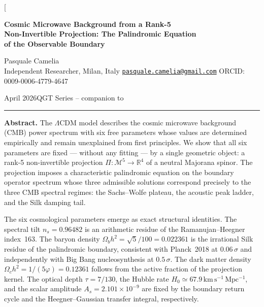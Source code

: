 \documentclass[twocolumn,10pt]{article}
\begin{document}
\emergencystretch=12pt
\frenchspacing\raggedbottom

\twocolumn[{%
\begin{center}
{\LARGE\bfseries
Cosmic Microwave Background from a Rank-5\\[4pt]
Non-Invertible Projection: The Palindromic Equation\\[4pt]
of the Observable Boundary}
\vspace{0.9em}

{\large Pasquale Camelia}\\[4pt]
{\normalsize Independent Researcher, Milan, Italy\quad
\href{mailto:pasquale.camelia@gmail.com}{\texttt{pasquale.camelia@gmail.com}}\quad
ORCID: 0009-0006-4779-4647}\\[5pt]
{\small April 2026\quad QGT Series -- companion to

}
\vspace{0.8em}
\end{center}

\noindent\rule{\linewidth}{0.5pt}\vspace{4pt}

\noindent\textbf{Abstract.}
The $\Lambda$CDM model describes the cosmic microwave background
(CMB) power spectrum with six free parameters whose values are
determined empirically and remain unexplained from first principles.
We show that all six parameters are fixed — without any fitting —
by a single geometric object: a rank-5 non-invertible projection
$\Pi:\mathcal{M}^5\to\mathbb{R}^4$ of a neutral Majorana spinor.
The projection imposes a characteristic palindromic equation on the
boundary operator spectrum whose three admissible solutions
correspond precisely to the three CMB spectral regimes: the
Sachs--Wolfe plateau, the acoustic peak ladder, and the Silk
damping tail.

The six cosmological parameters emerge as exact structural identities.
The spectral tilt $n_s = 0.96482$ is an arithmetic residue of the
Ramanujan--Heegner index~163.
The baryon density $\Omega_b h^2 = \sqrt{5}/100 = 0.022361$
is the irrational Silk residue of the palindromic boundary,
consistent with Planck~2018 at $0.06\,\sigma$ and independently
with Big Bang nucleosynthesis at $0.5\,\sigma$.
The dark matter density $\Omega_c h^2 = 1/(5\varphi) = 0.12361$
follows from the active fraction of the projection kernel.
The optical depth $\tau = 7/130$, the Hubble rate
$H_0 \simeq 67.9\,\mathrm{km\,s^{-1}\,Mpc^{-1}}$,
and the scalar amplitude $A_s = 2.101\times10^{-9}$ are fixed by
the boundary return cycle and the Heegner--Gaussian transfer integral,
respectively.

}
\end{document}
